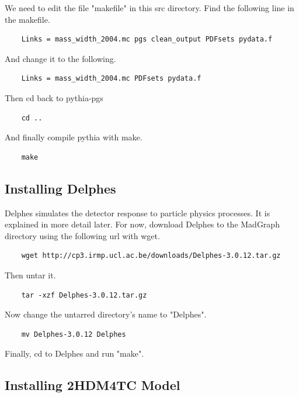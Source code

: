\documentclass{article}
\begin{document}
We need to edit the file "makefile" in this src directory. Find the following line in the makefile.

\begin{verbatim}
	Links = mass_width_2004.mc pgs clean_output PDFsets pydata.f
\end{verbatim}

And change it to the following.

\begin{verbatim}
	Links = mass_width_2004.mc PDFsets pydata.f
\end{verbatim}

Then cd back to pythia-pgs

\begin{verbatim}
	cd ..
\end{verbatim}

And finally compile pythia with make.

\begin{verbatim}
	make
\end{verbatim}

\subsection{Installing Delphes}

Delphes simulates the detector response to particle physics processes. It
is explained in more detail later. For now, download Delphes to the MadGraph
directory using the following url with wget.

\begin{verbatim}
	wget http://cp3.irmp.ucl.ac.be/downloads/Delphes-3.0.12.tar.gz
\end{verbatim}

Then untar it.

\begin{verbatim}
	tar -xzf Delphes-3.0.12.tar.gz
\end{verbatim}

Now change the untarred directory's name to "Delphes".

\begin{verbatim}
	mv Delphes-3.0.12 Delphes
\end{verbatim}

Finally, cd to Delphes and run "make".

\subsection{Installing 2HDM4TC Model}
\end{document}
